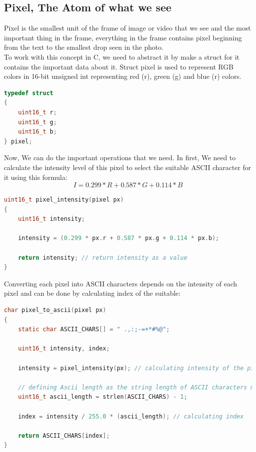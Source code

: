 \documentclass[a4paper,12pt]{article}
\begin{document}
\subsection{Pixel, The Atom of what we see}
Pixel is the smallest unit of the frame of image or video that we see and the most important thing in the frame, everything in the frame contains pixel beginning from the text to the smallest drop seen in the photo. \\

To work with this concept in C, we need to abstract it by make a struct for it contains the important data about it. Struct pixel is used to represent RGB colors in 16-bit unsigned int representing red (r), green (g) and blue (r) colors.

\begin{lstlisting}[language=c] 
typedef struct
{
    uint16_t r;
    uint16_t g;
    uint16_t b;
} pixel;
\end{lstlisting}
\newpage
Now, We can do the important operations that we need. In first, We need to calculate the intensity level of this pixel to select the suitable ASCII character for it using this formula:
$$I = 0.299*R + 0.587*G + 0.114*B$$ 

\begin{lstlisting}[language=c]
uint16_t pixel_intensity(pixel px)
{
    uint16_t intensity;

    intensity = (0.299 * px.r + 0.587 * px.g + 0.114 * px.b);

    return intensity; // return intensity as a value
}
\end{lstlisting}
Converting each pixel into ASCII characters depends on the intensity of each pixel and can be done by calculating index of the suitable:

\begin{lstlisting}[language=c]
char pixel_to_ascii(pixel px)
{
    static char ASCII_CHARS[] = " .,:;-=+*#%@";

    uint16_t intensity, index;

    intensity = pixel_intensity(px); // calculating intensity of the pixel

    // defining Ascii length as the string length of ASCII characters minus 1
    uint16_t ascii_length = strlen(ASCII_CHARS) - 1; 

    index = intensity / 255.0 * (ascii_length); // calculating index

    return ASCII_CHARS[index];
}


\end{lstlisting}
\end{document}
